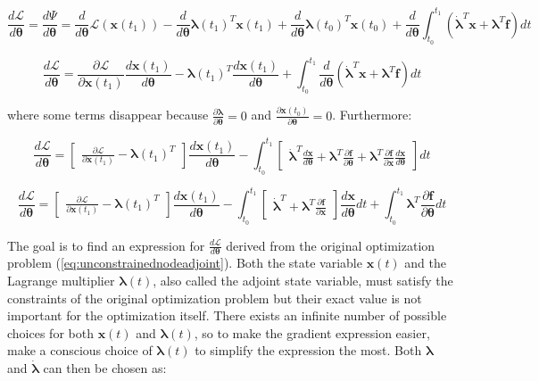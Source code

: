 $$
\frac{d \mathcal{L}}{d \bm{\theta}} = \frac{d \Psi}{d \bm{\theta}}
= \frac{d}{d \bm{\theta}} \mathcal{L}(\bm{x}(t_1))
- \frac{d}{d \bm{\theta}} \bm{\lambda}(t_1)^T \bm{x}(t_1)
+ \frac{d}{d \bm{\theta}} \bm{\lambda}(t_0)^T \bm{x}(t_0)
+ \frac{d}{d \bm{\theta}} \int_{t_0}^{t_1} (\dot{\bm{\lambda}}^T \bm{x} + \bm{\lambda}^T \bm{f}) dt
$$

$$
\frac{d \mathcal{L}}{d \bm{\theta}}
= \frac{\partial \mathcal{L}}{\partial \bm{x}(t_1)} \frac{d \bm{x}(t_1)}{d \bm{\theta}}
- \bm{\lambda}(t_1)^T \frac{d \bm{x}(t_1)}{d \bm{\theta}}
+ \int_{t_0}^{t_1} \frac{d}{d \bm{\theta}}(\dot{\bm{\lambda}}^T \bm{x} + \bm{\lambda}^T \bm{f}) dt
$$

\noindent where some terms disappear because $\frac{\partial \bm{\lambda}}{\partial \bm{\theta}} = 0$ and $\frac{\partial \bm{x}(t_0)}{\partial \bm{\theta}} = 0$. Furthermore:

$$
\frac{d \mathcal{L}}{d \bm{\theta}}
= \begin{bmatrix} \frac{\partial \mathcal{L}}{\partial \bm{x}(t_1)}
- \bm{\lambda}(t_1)^T \end{bmatrix} \frac{d \bm{x}(t_1)}{d \bm{\theta}}
- \int_{t_0}^{t_1} \begin{bmatrix} \dot{\bm{\lambda}}^T \frac{d \bm{x}}{d \bm{\theta}} + \bm{\lambda}^T \frac{\partial \bm{f}}{\partial \bm{\theta}}
+ \bm{\lambda}^T \frac{\partial \bm{f}}{\partial \bm{x}} \frac{d \bm{x}}{d \bm{\theta}} \end{bmatrix} dt
$$

$$
\frac{d \mathcal{L}}{d \bm{\theta}}
= \begin{bmatrix} \frac{\partial \mathcal{L}}{\partial \bm{x}(t_1)}
- \bm{\lambda}(t_1)^T \end{bmatrix} \frac{d \bm{x}(t_1)}{d \bm{\theta}}
- \int_{t_0}^{t_1} \begin{bmatrix} \dot{\bm{\lambda}}^T
+ \bm{\lambda}^T \frac{\partial \bm{f}}{\partial \bm{x}} \end{bmatrix} \frac{d \bm{x}}{d \bm{\theta}} dt
+ \int_{t_0}^{t_1} \bm{\lambda}^T \frac{\partial \bm{f}}{\partial \bm{\theta}} dt
$$

The goal is to find an expression for $\frac{d \mathcal{L}}{d \bm{\theta}}$ derived from the original optimization problem (\ref{eq:unconstrainednodeadjoint}). Both the state variable $\bm{x}(t)$ and the Lagrange multiplier $\bm{\lambda}(t)$, also called the adjoint state variable, must satisfy the constraints of the original optimization problem but their exact value is not important for the optimization itself. There exists an infinite number of possible choices for both $\bm{x}(t)$ and $\bm{\lambda}(t)$, so to make the gradient expression easier, make a conscious choice of $\bm{\lambda}(t)$ to simplify the expression the most. Both $\bm{\lambda}$ and $\dot{\bm{\lambda}}$ can then be chosen as:


